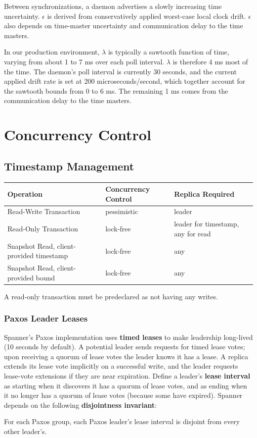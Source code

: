 \documentclass[11pt]{article}
\begin{document}
Between synchronizations, a daemon advertises a slowly increasing time uncertainty. \(\epsilon\) is
derived from conservatively applied worst-case local clock drift. \(\epsilon\) also depends on
time-master uncertainty and communication delay to the time masters.

In our production environment, \(\lambda\) is typically a sawtooth function of time, varying from
about 1 to 7 ms over each poll interval. \(\lambda\) is therefore 4 ms most of the time. The daemon’s
poll interval is currently 30 seconds, and the current applied drift rate is set at 200
microseconds/second, which together account for the sawtooth bounds from 0 to 6 ms. The remaining 1 ms
comes from the communication delay to the time masters.
\section{Concurrency Control}
\label{sec:org6fc708b}
\subsection{Timestamp Management}
\label{sec:orge6e492a}
\begin{center}
\begin{tabular}{lll}
\hline
Operation & Concurrency Control & Replica Required\\
\hline
Read-Write Transaction & pessimistic & leader\\
Read-Only Transaction & lock-free & leader for timestamp, any for read\\
Snapshot Read, client-provided timestamp & lock-free & any\\
Snapshot Read, client-provided bound & lock-free & any\\
\hline
\end{tabular}
\end{center}

A read-only transaction must be predeclared as not having any writes.
\subsubsection{Paxos Leader Leases}
\label{sec:org9ca059e}
Spanner’s Paxos implementation uses \textbf{timed leases} to make leadership long-lived (10 seconds by
default). A potential leader sends requests for timed lease votes; upon receiving a quorum of lease
votes the leader knows it has a lease. A replica extends its lease vote implicitly on a successful
write, and the leader requests lease-vote extensions if they are near expiration. Define a leader’s
\textbf{lease interval} as starting when it discovers it has a quorum of lease votes, and as ending when it no
longer has a quorum of lease votes (because some have expired). Spanner depends on the following
\textbf{disjointness invariant}:
\begin{center}
For each Paxos group, each Paxos leader’s lease interval is disjoint from
every other leader’s.
\end{center}
\end{document}

